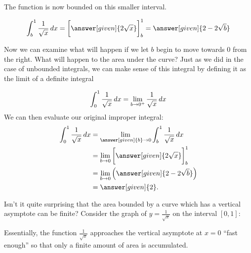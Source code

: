 \documentclass{ximera}
\begin{document}
\begin{example}
\begin{explanation}
The function is now bounded on this smaller interval. 

\[
\int_{b}^1 \frac{1}{\sqrt{x}} \d x=  \eval{\answer[given]{2\sqrt{x}}}_b^1=\answer[given]{2-2\sqrt{b}}
\]

Now we can examine what will happen if we let $b$ begin to move towards $0$ from the right. What will happen to the area under the curve? 
Just as we did in the case of unbounded integrals, we can make sense of this integral by defining it as the limit of a definite integral 

\[
\int_{0}^{1} \frac{1}{\sqrt{x}} \mathop{}\!d x=\lim_{b \to 0^{+}} \frac{1}{\sqrt{x}} \mathop{}\!d x
\]
We can then evaluate our original improper integral: 
    \begin{align*}
      \int_{0}^1 \frac{1}{\sqrt{x}} \d x &= \lim_{\answer[given]{b} \to 0} \int_{b}^1 \frac{1}{\sqrt{x}} \d x \\
      &=  \lim_{b \to 0}  \eval{\answer[given]{2\sqrt{x}}}_b^1 \\
      &=  \lim_{b \to 0} \left(\answer[given]{2-2\sqrt{b}}\right)\\
      &= \answer[given]{2}.
    \end{align*}

Isn't it quite surprising that the area bounded by a curve which has a
vertical asymptote can be finite? Consider the graph of $y=
\frac{1}{\sqrt{x}}$ on the interval $[0,1]$:

\begin{image}
\end{image}

Essentially, the function $\frac{1}{\sqrt{x}}$ approaches the vertical asymptote at $x=0$ ``fast enough'' so that only a finite amount of area is accumulated. 

  \end{explanation}
\end{example}
\end{document}
